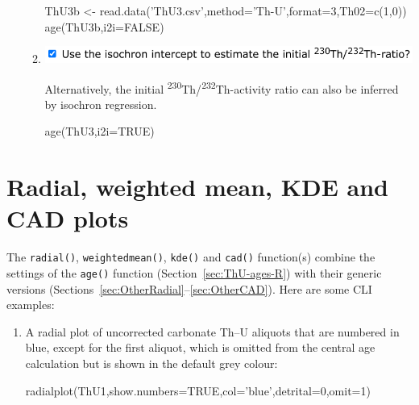 \begin{refsection}
\begin{enumerate}
\begin{enumerate}
\begin{script}
ThU3b <- read.data('ThU3.csv',method='Th-U',format=3,Th02=c(1,0))
age(ThU3b,i2i=FALSE)
\end{script}

    
\item\begin{minipage}[t]{.7\linewidth}
    \strut\vspace*{-\baselineskip}\newline
    \includegraphics[width=\linewidth]{../figures/ThUi2i.png}
  \end{minipage}
    \begin{minipage}[t]{.3\linewidth}
      Alternatively, the initial
      \textsuperscript{230}Th/\textsuperscript{232}Th-activity ratio
      can also be inferred by isochron regression.\\
    \end{minipage}    

\begin{script}
age(ThU3,i2i=TRUE)
\end{script}
    
  \end{enumerate}
  
\end{enumerate}

\section{Radial, weighted mean, KDE and CAD plots}

The \texttt{radial()}, \texttt{weightedmean()}, \texttt{kde()} and
\texttt{cad()} function(s) combine the settings of the \texttt{age()}
function (Section~\ref{sec:ThU-ages-R}) with their generic versions
(Sections~\ref{sec:OtherRadial}--\ref{sec:OtherCAD}). Here are some
CLI examples:

\begin{enumerate}

\item A radial plot of uncorrected carbonate Th--U aliquots that are
  numbered in blue, except for the first aliquot, which is omitted
  from the central age calculation but is shown in the default grey
  colour:
  
\begin{console}
radialplot(ThU1,show.numbers=TRUE,col='blue',detrital=0,omit=1)
\end{console}


\end{enumerate}
\end{refsection}
